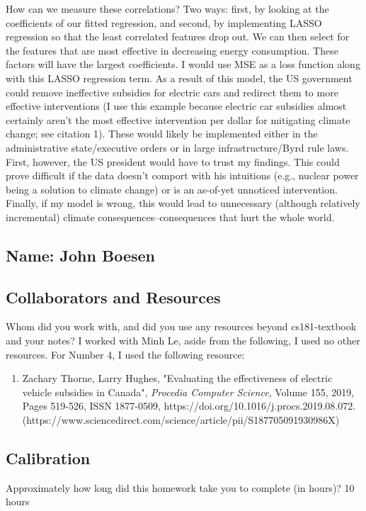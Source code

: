 \documentclass[submit]{harvardml}
\begin{document}
\newline
How can we measure these correlations? Two ways: first, by looking at the coefficients of our fitted regression, and second, by implementing LASSO regression so that the least correlated features drop out. We can then select for the features that are most effective in decreasing energy consumption. These factors will have the largest coefficients.
\newline
I would use MSE as a loss function along with this LASSO regression term. 
\newline
As a result of this model, the US government could remove ineffective subsidies for electric cars and redirect them to more effective interventions (I use this example because electric car subsidies almost certainly aren’t the most effective intervention per dollar for mitigating climate change; see citation 1). These would likely be implemented either in the administrative state/executive orders or in large infrastructure/Byrd rule laws. First, however, the US president would have to trust my findings. This could prove difficult if the data doesn’t comport with his intuitions (e.g., nuclear power being a solution to climate change) or is an as-of-yet unnoticed intervention. Finally, if my model is wrong, this would lead to unnecessary (although relatively incremental) climate consequences--consequences that hurt the whole world. 
\subsection*{Name: John Boesen}

\subsection*{Collaborators and Resources}
Whom did you work with, and did you use any resources beyond cs181-textbook and your notes? I worked with Minh Le, aside from the following, I used no other resources. 
For Number 4, I used the following resource:
\begin{enumerate}
    \item Zachary Thorne, Larry Hughes,
"Evaluating the effectiveness of electric vehicle subsidies in Canada",
\textit{Procedia Computer Science},
Volume 155,
2019,
Pages 519-526,
ISSN 1877-0509,
https://doi.org/10.1016/j.procs.2019.08.072.
(https://www.sciencedirect.com/science/article/pii/S187705091930986X)
\end{enumerate}


\subsection*{Calibration}
Approximately how long did this homework take you to complete (in hours)? 
10 hours
\end{document}
